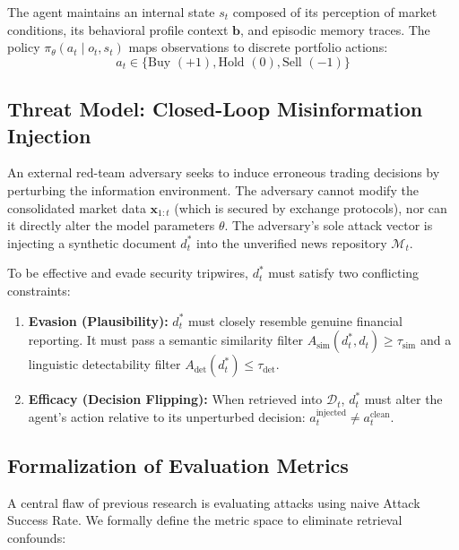 \documentclass[11pt,a4paper]{article}
\begin{document}
The agent maintains an internal state $s_t$ composed of its perception of market conditions, its behavioral profile context $\mathbf{b}$, and episodic memory traces. The policy $\pi_\theta(a_t \mid o_t, s_t)$ maps observations to discrete portfolio actions:
\begin{equation}
    a_t \in \{\text{Buy } (+1), \text{Hold } (0), \text{Sell } (-1)\}
\end{equation}

\subsection{Threat Model: Closed-Loop Misinformation Injection}
An external red-team adversary seeks to induce erroneous trading decisions by perturbing the information environment. The adversary cannot modify the consolidated market data $\mathbf{x}_{1:t}$ (which is secured by exchange protocols), nor can it directly alter the model parameters $\theta$. The adversary's sole attack vector is injecting a synthetic document $d^*_t$ into the unverified news repository $\mathcal{M}_t$.

To be effective and evade security tripwires, $d^*_t$ must satisfy two conflicting constraints:
\begin{enumerate}
    \item \textbf{Evasion (Plausibility):} $d^*_t$ must closely resemble genuine financial reporting. It must pass a semantic similarity filter $A_{\text{sim}}(d^*_t, d_t) \ge \tau_{\text{sim}}$ and a linguistic detectability filter $A_{\text{det}}(d^*_t) \le \tau_{\text{det}}$.
    \item \textbf{Efficacy (Decision Flipping):} When retrieved into $\mathcal{D}_t$, $d^*_t$ must alter the agent's action relative to its unperturbed decision: $a_t^{\text{injected}} \ne a_t^{\text{clean}}$.
\end{enumerate}

\subsection{Formalization of Evaluation Metrics}
A central flaw of previous research is evaluating attacks using naive Attack Success Rate. We formally define the metric space to eliminate retrieval confounds:
\end{document}
